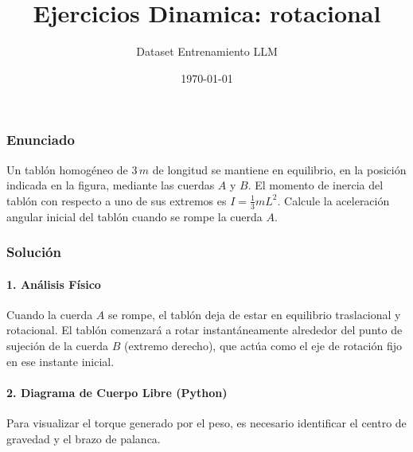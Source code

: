 \documentclass[12pt, a4paper]{article}
\title{Ejercicios Dinamica: rotacional}
\author{Dataset Entrenamiento LLM}
\date{\today}
\begin{document}
\subsubsection*{Enunciado}
Un tablón homogéneo de $3 \, \si{m}$ de longitud se mantiene en equilibrio, en la posición indicada en la figura, mediante las cuerdas $A$ y $B$. El momento de inercia del tablón con respecto a uno de sus extremos es $I = \frac{1}{3} m L^2$. Calcule la aceleración angular inicial del tablón cuando se rompe la cuerda $A$.

\begin{center}
\end{center}

\subsubsection*{Solución}

\paragraph{1. Análisis Físico}
Cuando la cuerda $A$ se rompe, el tablón deja de estar en equilibrio traslacional y rotacional. El tablón comenzará a rotar instantáneamente alrededor del punto de sujeción de la cuerda $B$ (extremo derecho), que actúa como el eje de rotación fijo en ese instante inicial.

\paragraph{2. Diagrama de Cuerpo Libre (Python)}
Para visualizar el torque generado por el peso, es necesario identificar el centro de gravedad y el brazo de palanca.
\end{document}
